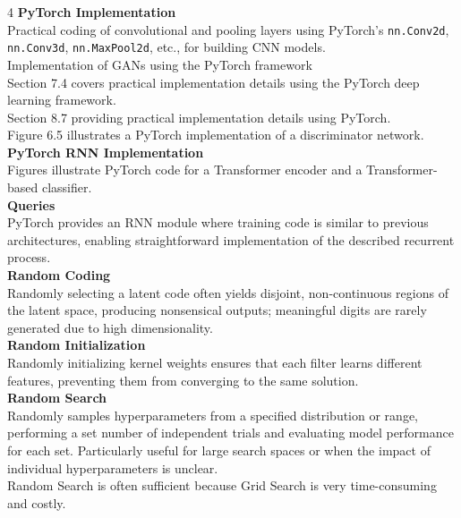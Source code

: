 \documentclass[8pt]{extarticle}
\begin{document}
\begin{multicols}{4}
{\vspace{2pt}\textbf{PyTorch Implementation}\\
Practical coding of convolutional and pooling layers using PyTorch's \texttt{nn.Conv2d}, \texttt{nn.Conv3d}, \texttt{nn.MaxPool2d}, etc., for building CNN models.\\
Implementation of GANs using the PyTorch framework\\
Section 7.4 covers practical implementation details using the PyTorch deep learning framework.\\
Section 8.7 providing practical implementation details using PyTorch.\\
Figure 6.5 illustrates a PyTorch implementation of a discriminator network.\\

\vspace{2pt}\textbf{PyTorch RNN Implementation}\\
Figures illustrate PyTorch code for a Transformer encoder and a Transformer-based classifier.\\
\vspace{2pt}\textbf{Queries}\\
PyTorch provides an RNN module where training code is similar to previous architectures, enabling straightforward implementation of the described recurrent process.\\
\vspace{2pt}\textbf{Random Coding}\\
Randomly selecting a latent code often yields disjoint, non-continuous regions of the latent space, producing nonsensical outputs; meaningful digits are rarely generated due to high dimensionality.\\
\vspace{2pt}\textbf{Random Initialization}\\
Randomly initializing kernel weights ensures that each filter learns different features, preventing them from converging to the same solution.\\
\vspace{2pt}\textbf{Random Search}\\
Randomly samples hyperparameters from a specified distribution or range, performing a set number of independent trials and evaluating model performance for each set. Particularly useful for large search spaces or when the impact of individual hyperparameters is unclear.\\
Random Search is often sufficient because Grid Search is very time-consuming and costly.\\
}
\end{multicols}
\end{document}
